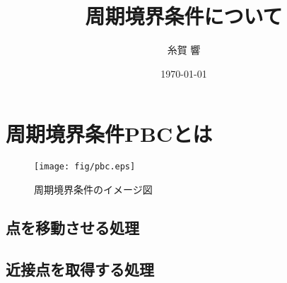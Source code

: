 \documentclass[a4j,12pt]{jarticle}
\title{周期境界条件について}
\author{糸賀 響}
\date{\today}
\begin{document}
\maketitle \thispagestyle{empty}
\section{周期境界条件PBCとは}
\begin{figure}[htbp]
   \begin{center}
   \texttt{[image: fig/pbc.eps]}
   \end{center}
   \caption{
   \label{fig:pbc}
      周期境界条件のイメージ図
   }
\end{figure}

\subsection{点を移動させる処理}

\subsection{近接点を取得する処理}
\end{document}
